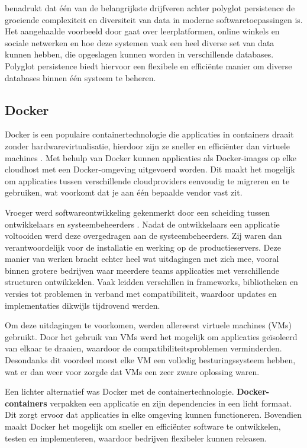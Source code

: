 \textcite{Candel2022} benadrukt dat één van de belangrijkste drijfveren achter polyglot persistence de groeiende complexiteit en diversiteit van data in moderne softwaretoepassingen is. Het aangehaalde voorbeeld door \textcite{Candel2022} gaat over leerplatformen, online winkels en sociale netwerken en hoe deze systemen vaak een heel diverse set van data kunnen hebben, die opgeslagen kunnen worden in verschillende databases. Polyglot persistence biedt  hiervoor een flexibele en efficiënte manier om diverse databases binnen één systeem te beheren.

\subsection{Docker}

Docker is een populaire containertechnologie die applicaties in containers draait zonder hardwarevirtualisatie, hierdoor zijn ze sneller en efficiënter dan virtuele machines \autocite{Kim2022}. Met behulp van Docker kunnen applicaties als Docker-images op elke cloudhost met een Docker-omgeving uitgevoerd worden. Dit maakt het mogelijk om applicaties tussen verschillende cloudproviders eenvoudig te migreren en te gebruiken, wat voorkomt dat je aan één bepaalde vendor vast zit.\newline

Vroeger werd softwareontwikkeling gekenmerkt door een scheiding tussen ontwikkelaars en systeembeheerders \autocite{Schenker2023}. Nadat de ontwikkelaars een applicatie voltooiden werd deze overgedragen aan de systeembeheerders. Zij waren dan verantwoordelijk voor de installatie en werking op de productieservers. Deze manier van werken bracht echter heel wat uitdagingen met zich mee, vooral binnen grotere bedrijven waar meerdere teams applicaties met verschillende structuren ontwikkelden. Vaak leidden verschillen in frameworks, bibliotheken en versies tot problemen in verband met compatibiliteit, waardoor updates en implementaties dikwijls tijdrovend werden.

Om deze uitdagingen te voorkomen, werden allereerst virtuele machines (VMs) gebruikt. Door het gebruik van VMs werd het mogelijk om applicaties geïsoleerd van elkaar te draaien, waardoor de compatibiliteitsproblemen verminderden. Desondanks dit voordeel moest elke VM een volledig besturingssysteem hebben, wat er dan weer voor zorgde dat VMs een zeer zware oplossing waren.

Een lichter alternatief was Docker met de containertechnologie. \textbf{Docker-containers} verpakken een applicatie en zijn dependencies in een licht formaat. Dit zorgt ervoor dat applicaties in elke omgeving kunnen functioneren. Bovendien maakt Docker het mogelijk om sneller en efficiënter software te ontwikkelen, testen en implementeren, waardoor bedrijven flexibeler kunnen releasen.\newline

